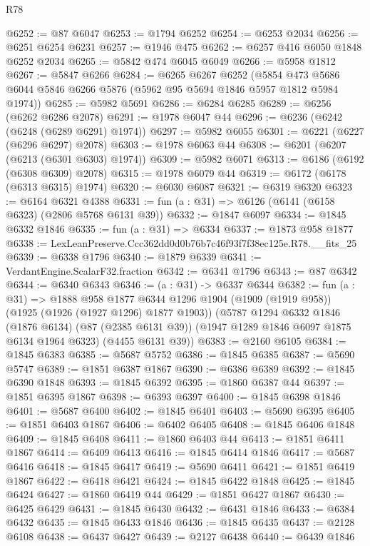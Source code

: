 \begin{lexlean}{R78}
\begin{coremodule}
@6252 := @87 @6047
@6253 := @1794 @6252
@6254 := @6253 @2034
@6256 := @6251 @6254 @6231
@6257 := @1946 @475
@6262 := @6257 @416 @6050 @1848 @6252 @2034
@6265 := @5842 @474 @6045 @6049
@6266 := @5958 @1812
@6267 := @5847 @6266
@6284 := @6265
    @6267
    @6252
    (@5854 @473 @5686 @6044 @5846 @6266 @5876 (@5962 @95 @5694 @1846 @5957 @1812 @5984 @1974))
@6285 := @5982 @5691
@6286 := @6284 @6285
@6289 := @6256 (@6262 @6286 @2078)
@6291 := @1978 @6047 @44
@6296 := @6236 (@6242 (@6248 (@6289 @6291) @1974))
@6297 := @5982 @6055
@6301 := @6221 (@6227 (@6296 @6297) @2078)
@6303 := @1978 @6063 @44
@6308 := @6201 (@6207 (@6213 (@6301 @6303) @1974))
@6309 := @5982 @6071
@6313 := @6186 (@6192 (@6308 @6309) @2078)
@6315 := @1978 @6079 @44
@6319 := @6172 (@6178 (@6313 @6315) @1974)
@6320 := @6030 @6087
@6321 := @6319 @6320
@6323 := @6164 @6321 @4388
@6331 := fun (a : @31) => @6126 (@6141 (@6158 @6323) (@2806 @5768 @6131 @39))
@6332 := @1847 @6097
@6334 := @1845 @6332 @1846
@6335 := fun (a : @31) => @6334
@6337 := @1873 @958 @1877
@6338 := LexLeanPreserve.Ccc362dd0d0b76b7c46f93f7f38ec125e.R78.__fits_25
@6339 := @6338 @1796
@6340 := @1879 @6339
@6341 := VerdantEngine.ScalarF32.fraction
@6342 := @6341 @1796
@6343 := @87 @6342
@6344 := @6340 @6343
@6346 := (a : @31) -> @6337 @6344
@6382 := fun (a : @31) =>
  @1888
    @958
    @1877
    @6344
    @1296
    @1904
    (@1909 (@1919 @958))
    (@1925 (@1926 (@1927 @1296) @1877 @1903))
    (@5787
      @1294
      @6332
      @1846
      (@1876 @6134)
      (@87 (@2385 @6131 @39))
      (@1947 @1289 @1846 @6097 @1875 @6134 @1964 @6323)
      (@4455 @6131 @39))
@6383 := @2160 @6105
@6384 := @1845 @6383
@6385 := @5687 @5752
@6386 := @1845 @6385
@6387 := @5690 @5747
@6389 := @1851 @6387 @1867
@6390 := @6386 @6389
@6392 := @1845 @6390 @1848
@6393 := @1845 @6392
@6395 := @1860 @6387 @44
@6397 := @1851 @6395 @1867
@6398 := @6393 @6397
@6400 := @1845 @6398 @1846
@6401 := @5687 @6400
@6402 := @1845 @6401
@6403 := @5690 @6395
@6405 := @1851 @6403 @1867
@6406 := @6402 @6405
@6408 := @1845 @6406 @1848
@6409 := @1845 @6408
@6411 := @1860 @6403 @44
@6413 := @1851 @6411 @1867
@6414 := @6409 @6413
@6416 := @1845 @6414 @1846
@6417 := @5687 @6416
@6418 := @1845 @6417
@6419 := @5690 @6411
@6421 := @1851 @6419 @1867
@6422 := @6418 @6421
@6424 := @1845 @6422 @1848
@6425 := @1845 @6424
@6427 := @1860 @6419 @44
@6429 := @1851 @6427 @1867
@6430 := @6425 @6429
@6431 := @1845 @6430
@6432 := @6431 @1846
@6433 := @6384 @6432
@6435 := @1845 @6433 @1846
@6436 := @1845 @6435
@6437 := @2128 @6108
@6438 := @6437 @6427
@6439 := @2127 @6438
@6440 := @6439 @1846

\end{coremodule}
\end{lexlean}
